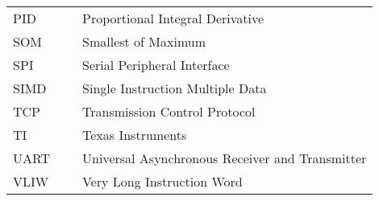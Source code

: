 \makeatletter
\setlength{\@fptop}{0pt}
\makeatother

\begin{table}[t!]
	\centering
	\begin{tabular}{l l l}
		PID & ~ & Proportional Integral Derivative \\
		SOM & ~ & Smallest of Maximum \\
		SPI & ~ & Serial Peripheral Interface \\
		SIMD & ~ & Single Instruction Multiple Data \\
		TCP & ~ & Transmission Control Protocol \\
		TI & ~ & Texas Instruments \\
		UART & ~ & Universal Asynchronous Receiver and Transmitter\\
		VLIW & ~ & Very Long Instruction Word
		
	\end{tabular}
\end{table}

